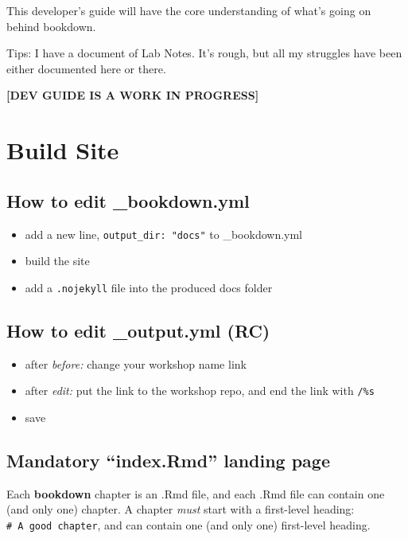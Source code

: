 \documentclass[
]{book}
\providecommand{\tightlist}{%
  \setlength{\itemsep}{0pt}\setlength{\parskip}{0pt}}
\theoremstyle{definition}
\theoremstyle{definition}
\theoremstyle{definition}
\theoremstyle{definition}
\theoremstyle{remark}
\begin{document}
This developer's guide will have the core understanding of what's going on behind bookdown.

Tips: I have a document of Lab Notes. It's rough, but all my struggles have been either documented here or there.

\textbf{{[}DEV GUIDE IS A WORK IN PROGRESS{]}}

\chapter{Build Site}\label{build-site}

\section{How to edit \_bookdown.yml}\label{how-to-edit-_bookdown.yml}

\begin{itemize}
\tightlist
\item
  add a new line, \texttt{output\_dir:\ "docs"} to \_bookdown.yml
\item
  build the site
\item
  add a \texttt{.nojekyll} file into the produced docs folder
\end{itemize}

\section{How to edit \_output.yml (RC)}\label{how-to-edit-_output.yml-rc}

\begin{itemize}
\tightlist
\item
  after \emph{before:} change your workshop name link
\item
  after \emph{edit:} put the link to the workshop repo, and end the link with \texttt{/\%s}
\item
  save
\end{itemize}

\section{Mandatory ``index.Rmd'' landing page}\label{mandatory-index.rmd-landing-page}

Each \textbf{bookdown} chapter is an .Rmd file, and each .Rmd file can contain one (and only one) chapter. A chapter \emph{must} start with a first-level heading: \texttt{\#\ A\ good\ chapter}, and can contain one (and only one) first-level heading.
\end{document}
